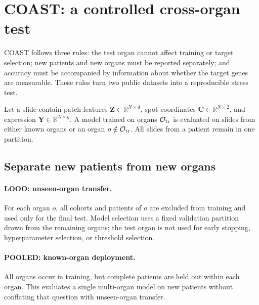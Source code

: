 \section{COAST: a controlled cross-organ test}
\label{sec:protocol}
COAST follows three rules: the test organ cannot affect training or target selection; new patients
and new organs must be reported separately; and accuracy must be accompanied by information about
whether the target genes are measurable. These rules turn two public datasets into a reproducible
stress test.

Let a slide contain patch features $\mathbf Z\in\mathbb R^{N\times d}$, spot coordinates
$\mathbf C\in\mathbb R^{N\times2}$, and expression $\mathbf Y\in\mathbb R^{N\times g}$. A model
trained on organs $\mathcal O_{\rm tr}$ is evaluated on slides from either known organs or an organ
$o\notin\mathcal O_{\rm tr}$. All slides from a patient remain in one partition.

\subsection{Separate new patients from new organs}
\paragraph{LOOO: unseen-organ transfer.}
For each organ $o$, all cohorts and patients of $o$ are excluded from training and used only for the
final test. Model selection uses a fixed validation partition drawn from the remaining organs; the
test organ is not used for early stopping, hyperparameter selection, or threshold selection.

\paragraph{POOLED: known-organ deployment.}
All organs occur in training, but complete patients are held out within each organ. This evaluates a
single multi-organ model on new patients without conflating that question with unseen-organ transfer.

\begin{table}[t]
\centering\small
\setlength{\tabcolsep}{3.6pt}
\caption{The protocols answer different questions and must be reported separately.}
\label{tab:regimes}
\end{table}

